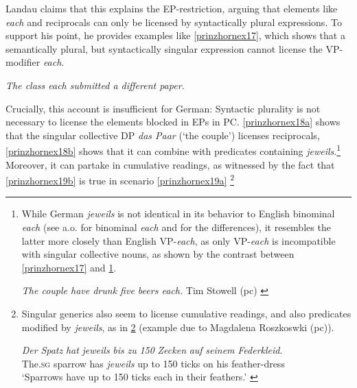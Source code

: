 \documentclass[output=paper,colorlinks,citecolor=brown,
]{langscibook}
\begin{document}
Landau claims that this explains the EP-restriction, arguing that elements like \textit{each} and reciprocals can only be licensed by syntactically plural expressions. To support his point, he provides  examples like \ref{prinzhornex17}, which shows that a semantically plural, but syntactically singular expression cannot license the VP-modifier \textit{each}.


\ea * \textit{The class each submitted a different paper.} \phantom{.}\hfill \cite[49 (66d)]{Landau:2000} \label{prinzhornex17}
\z

Crucially, this account is insufficient for German: Syntactic plurality is not necessary to license the elements  blocked in EPs in PC. \ref{prinzhornex18a} shows that the singular collective DP {\it  das Paar} (`the couple') licenses reciprocals,  \ref{prinzhornex18b} shows that it can combine with predicates containing \textit{jeweils}.\footnote{While German  \textit{jeweils} is not identical in its behavior to English binominal  \textit{each} (see \citealt{Stowell:2013} a.o. for binominal \textit{each} and \citealt{Zimmermann:2002} for the differences), it resembles the latter more closely than English VP-\textit{each}, as only VP-\textit{each} is incompatible with singular collective nouns, as shown by the contrast between \ref{prinzhornex17} and \ref{prinzhornfnnex5}.

\ea    \textit{The couple have drunk five beers each.} \hfill Tim Stowell (pc)  \label{prinzhornfnnex5} \z  

} Moreover, it can partake in cumulative readings, as witnessed by the fact that \ref{prinzhornex19b} is true in scenario \ref{prinzhornex19a} \footnote{Singular generics also seem to license cumulative readings,  and also predicates modified by \textit{jeweils}, as in \ref{prinzhornexfn45} (example due to Magdalena Roszkoswki (pc)).

\ea 
\gll \textit{Der} \textit{Spatz} \textit{hat} \textit{jeweils} \textit{bis} \textit{zu} \textit{150} \textit{Zecken} \textit{auf} \textit{seinem} \textit{Federkleid}.\\
The.\textsc{sg} sparrow has \textit{jeweils} up to 150 ticks on his feather-dress\\
\glt `Sparrows have up to 150 ticks each in their feathers.'
\label{prinzhornexfn45} 
\z

}
\end{document}
